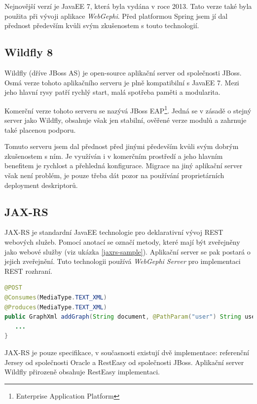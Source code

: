 \documentclass[thesis=M,czech]{FITthesis}[2014/05/6]
\begin{document}
Nejnovější verzí je JavaEE 7, která byla vydána v roce 2013. Tato verze také byla použita při vývoji aplikace \textit{WebGephi}. Před platformou Spring jsem jí dal přednost především kvůli svým
zkušenostem s touto technologií.

\subsection{Wildfly 8\cite{wildfly}}
Wildfly (dříve JBoss AS) je open-source aplikační server od společnosti JBoss. Osmá verze tohoto aplikačního serveru je plně kompatibilní s JavaEE 7.
Mezi jeho hlavní rysy patří rychlý start, malá spotřeba paměti a modularita.

Komerční verze tohoto serveru se nazývá JBoss EAP\footnote{Enterprise Application Platform}. Jedná se v zásadě o stejný server jako Wildfly, obsahuje 
však jen stabilní, ověřené verze modulů a zahrnuje také placenou podporu.

Tomuto serveru jsem dal přednost před jinými především kvůli svým dobrým zkušenostem s ním. Je využíván i v komerčním prostředí a jeho hlavním benefitem je rychlost
a přehledná konfigurace. Migrace na jiný aplikační server však není problém, je pouze třeba dát pozor na používání proprietárních deployment deskriptorů.

\subsection{JAX-RS\cite{jaxrs}}
JAX-RS je standardní JavaEE technologie pro deklarativní vývoj REST webových služeb. Pomocí anotací se označí metody, které mají být zveřejněny jako webové
služby (viz ukázka \ref{jaxrs-sample}). Aplikační server se pak postará o jejich zveřejnění. Tuto technologii používá \textit{WebGephi Server} pro
implementaci REST rozhraní.

\begin{lstlisting}[caption=Definice RESTful služby pro import grafu, label=jaxrs-sample, language=java]
@POST   
@Consumes(MediaType.TEXT_XML)
@Produces(MediaType.TEXT_XML)
public GraphXml addGraph(String document, @PathParam("user") String user, @QueryParam("name") String name, @QueryParam("format") String format) {
   ...
}
\end{lstlisting} 

JAX-RS je pouze specifikace, v současnosti existují dvě implementace: referenční Jersey od společnosti Oracle a RestEasy od společnosti JBoss. Aplikační server Wildfly přirozeně
obsahuje RestEasy implementaci.
\end{document}
